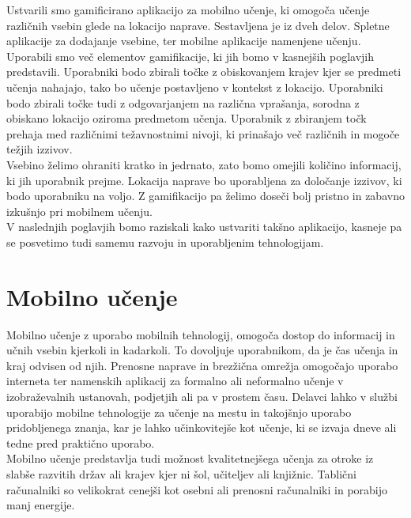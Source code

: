 \documentclass[a4paper, 12pt]{book}
\begin{document}
Ustvarili smo gamificirano aplikacijo za mobilno učenje, ki omogoča učenje različnih vsebin glede na lokacijo naprave. Sestavljena je iz dveh delov. Spletne aplikacije za dodajanje vsebine, ter mobilne aplikacije namenjene učenju. Uporabili smo več elementov gamifikacije, ki jih bomo v kasnejših poglavjih predstavili. Uporabniki bodo zbirali točke z obiskovanjem krajev kjer se predmeti učenja nahajajo, tako bo učenje postavljeno v kontekst z lokacijo. Uporabniki bodo zbirali točke tudi z odgovarjanjem na različna vprašanja, sorodna z obiskano lokacijo oziroma predmetom učenja. Uporabnik z zbiranjem točk prehaja med različnimi težavnostnimi nivoji, ki prinašajo več različnih in mogoče težjih izzivov.\\Vsebino želimo ohraniti kratko in jedrnato, zato bomo omejili količino informacij, ki jih uporabnik prejme. Lokacija naprave bo uporabljena za določanje izzivov, ki bodo uporabniku na voljo.
Z gamifikacijo pa želimo doseči bolj pristno in zabavno izkušnjo pri mobilnem učenju.\\V naslednjih poglavjih bomo raziskali kako ustvariti takšno aplikacijo, kasneje pa se posvetimo tudi samemu razvoju in uporabljenim tehnologijam.

\chapter{Mobilno učenje}
\label{ch2}

Mobilno učenje z uporabo mobilnih tehnologij, omogoča dostop do informacij in učnih vsebin kjerkoli in kadarkoli. To dovoljuje uporabnikom, da je čas učenja in kraj odvisen od njih. Prenosne naprave in brezžična omrežja omogočajo uporabo interneta ter namenskih aplikacij za formalno ali neformalno učenje v izobraževalnih ustanovah, podjetjih ali pa v prostem času. Delavci lahko v službi uporabijo mobilne tehnologije za učenje na mestu in takojšnjo uporabo pridobljenega znanja, kar je lahko učinkovitejše
kot učenje, ki se izvaja dneve ali tedne pred praktično uporabo.\\
Mobilno učenje predstavlja tudi možnost kvalitetnejšega učenja za otroke iz slabše razvitih držav ali krajev kjer ni šol, učiteljev ali knjižnic. Tablični računalniki so velikokrat cenejši kot osebni ali prenosni računalniki in porabijo manj energije.
\end{document}
